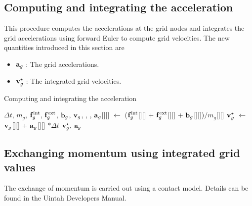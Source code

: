 \subsection{Computing and integrating the acceleration}
This procedure computes the accelerations at the grid nodes and integrates the grid accelerations
using forward Euler to compute grid velocities. The new quantities introduced in this section are
\begin{itemize} 
  \setlength\itemsep{1pt}
  \item $\mathbf{a}_{g}$ : {\Ochre The grid accelerations.}
  \item $\mathbf{v}_{g}^\star$ : {\Ochre The integrated grid velocities.}
\end{itemize}
\begin{breakablealgorithm}
  \caption{Computing and integrating the acceleration}
  \begin{algorithmic}[1]
    \Require $\Delta t$, $m_g$, $\mathbf{f}^{\text{int}}_g$, $\mathbf{f}^{\text{ext}}_g$, $\mathbf{b}_g$, $\mathbf{v}_g$,
             , ,
          \State $\mathbf{a}_g$[\TTmatl][\TTnode] $\leftarrow$ 
            ($\mathbf{f}^{\text{int}}_g$[\TTmatl][\TTnode] +
             $\mathbf{f}^{\text{ext}}_g$[\TTmatl][\TTnode] + 
             $\mathbf{b}_g$[\TTmatl][\TTnode])$/m_g$[\TTmatl][\TTnode]
          \State $\mathbf{v}_g^{\star}$ $\leftarrow$ $\mathbf{v}_g$[\TTmatl][\TTnode] + 
            $\mathbf{a}_g$[\TTmatl][\TTnode] $* \Delta t$
        \EndFor
      \EndFor
      \State \Return $\mathbf{v}_g^{\star}$, $\mathbf{a}_g$
    \EndProcedure
  \end{algorithmic}
\end{breakablealgorithm}

\subsection{Exchanging momentum using integrated grid values}
The exchange of momentum is carried out using a contact model.  Details can be found in the
Uintah Developers Manual.

